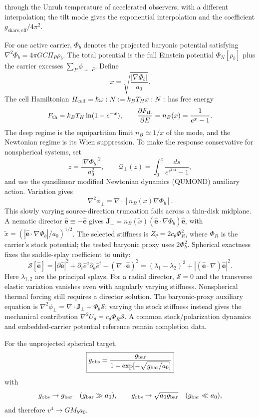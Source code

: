 \documentclass[11pt]{article}
\begin{document}
through the Unruh temperature of accelerated observers, with a different interpolation; the tilt mode gives the exponential interpolation and the coefficient $g_{\mathrm{share,eff}}/4\pi^2$.

For one active carrier, $\Phi_b$ denotes the projected baryonic potential satisfying $\nabla^2\Phi_b=4\pi GC\Pi_P\rho_b$. The total potential is the full Einstein potential $\Phi_N[\rho_b]$ plus the carrier excesses $\sum_P\phi_{\perp,P}$. Define
\[
x=\sqrt{\frac{|\nabla\Phi_b|}{a_0}}.
\]
The cell Hamiltonian $H_{\rm cell}=\hbar\omega:N:=k_BT_Hx:N:$ has free energy
\[
F_{\rm th}=k_BT_H\ln(1-e^{-x}),
\qquad
\frac{\partial F_{\rm th}}{\partial E}=n_B(x)=\frac1{e^x-1}.
\]
The deep regime is the equipartition limit $n_B\simeq1/x$ of the mode, and the Newtonian regime is its Wien suppression.
To make the response conservative for nonspherical systems, set
\[
z=\frac{|\nabla\Phi_b|^2}{a_0^2},
\qquad
\mathcal Q_\perp(z)=\int_0^z\frac{ds}{e^{s^{1/4}}-1},
\]
and use the quasilinear modified Newtonian dynamics (QUMOND) auxiliary action. Variation gives
\[
\boxed{
\nabla^2\phi_\perp
=\nabla\cdot\left[n_B(x)\nabla\Phi_b\right].
}
\]
This slowly varying source-direction truncation fails across a thin-disk midplane. A nematic director $\hat{\mathbf e}\equiv-\hat{\mathbf e}$ gives $\mathbf J_\perp=n_B(\widetilde x)(\hat{\mathbf e}\cdot\nabla\Phi_b)\hat{\mathbf e}$, with $\widetilde x=(|\hat{\mathbf e}\cdot\nabla\Phi_b|/a_0)^{1/2}$. The selected stiffness is $Z_\theta=2c_\theta\Phi_R^2$, where $\Phi_R$ is the carrier's stock potential; the tested baryonic proxy uses $2\Phi_b^2$. Spherical exactness fixes the saddle-splay coefficient to unity:
\[
\mathcal S[\hat{\mathbf e}]=|\partial\hat{\mathbf e}|^2+
\partial_i\hat e^a\partial_a\hat e^i-(\nabla\cdot\hat{\mathbf e})^2
=(\lambda_1-\lambda_2)^2+|(\hat{\mathbf e}\cdot\nabla)\hat{\mathbf e}|^2.
\]
Here $\lambda_{1,2}$ are the principal splays. For a radial director, $\mathcal S=0$ and the transverse elastic variation vanishes even with angularly varying stiffness. Nonspherical thermal forcing still requires a director solution. The baryonic-proxy auxiliary equation is $\nabla^2\phi_\perp=\nabla\cdot\mathbf J_\perp+\Phi_b\mathcal S$; varying the stock stiffness instead gives the mechanical contribution $\nabla^2U_\theta=c_\theta\Phi_R\mathcal S$. A common stock/polarization dynamics and embedded-carrier potential reference remain completion data.

For the unprojected spherical target,
\[
\boxed{
 g_{\rm obs}
=\frac{g_{\rm bar}}
{1-\exp[-\sqrt{g_{\rm bar}/a_0}]}
}
\]
with
\[
g_{\rm obs}\to g_{\rm bar}\quad(g_{\rm bar}\gg a_0),
\qquad
g_{\rm obs}\to\sqrt{a_0g_{\rm bar}}\quad(g_{\rm bar}\ll a_0),
\]
and therefore $v^4\to GM_ba_0$.
\end{document}
